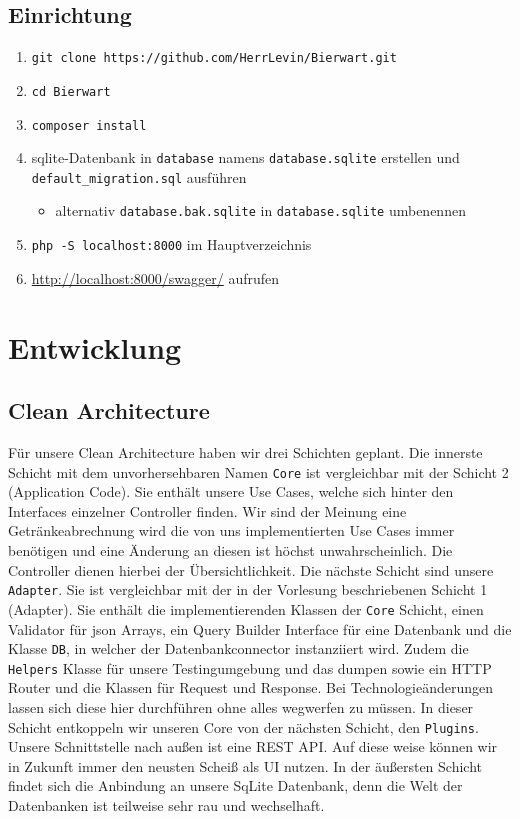 \documentclass[12pt,a4paper,titlepage,ngerman,pdftex]{report}
\begin{document}
    \section{Einrichtung}\label{sec:einrichtung}

    \begin{enumerate}
        \item \texttt{git clone https://github.com/HerrLevin/Bierwart.git}
        \item \texttt{cd Bierwart}
        \item \texttt{composer install}
        \item sqlite-Datenbank in \texttt{database} namens \texttt{database.sqlite} erstellen und\\ \texttt{default\_migration.sql} ausführen
        \begin{itemize}
            \item alternativ \texttt{database.bak.sqlite} in \texttt{database.sqlite} umbenennen
        \end{itemize}
        \item \texttt{php -S localhost:8000} im Hauptverzeichnis
        \item \url{http://localhost:8000/swagger/} aufrufen
    \end{enumerate}


    \chapter{Entwicklung}\label{ch:entwicklung}
    \section{Clean Architecture}\label{sec:cleanarchitecture}
    Für unsere Clean Architecture haben wir drei Schichten geplant.
    Die innerste Schicht mit dem unvorhersehbaren Namen \verb|Core| ist vergleichbar mit der Schicht 2 (Application Code).
    Sie enthält unsere Use Cases, welche sich hinter den Interfaces einzelner Controller finden.
    Wir sind der Meinung eine Getränkeabrechnung wird die von uns implementierten Use Cases immer benötigen und eine Änderung an diesen ist höchst unwahrscheinlich.
    Die Controller dienen hierbei der Übersichtlichkeit.
    Die nächste Schicht sind unsere \verb|Adapter|.
    Sie ist vergleichbar mit der in der Vorlesung beschriebenen Schicht 1 (Adapter).
    Sie enthält die implementierenden Klassen der \verb|Core| Schicht, einen Validator für json Arrays, ein Query Builder Interface für eine Datenbank und die Klasse \verb|DB|, in welcher der Datenbankconnector instanziiert wird.
    Zudem die \verb|Helpers| Klasse für unsere Testingumgebung und das dumpen sowie ein HTTP Router und die Klassen für Request und Response.
    Bei Technologieänderungen lassen sich diese hier durchführen ohne alles wegwerfen zu müssen.
    In dieser Schicht entkoppeln wir unseren Core von der nächsten Schicht, den \verb|Plugins|.
    Unsere Schnittstelle nach außen ist eine REST API.
    Auf diese weise können wir in Zukunft immer den neusten Scheiß als UI nutzen.
    In der äußersten Schicht findet sich die Anbindung an unsere SqLite Datenbank, denn die Welt der Datenbanken ist teilweise sehr rau und wechselhaft.
\end{document}

